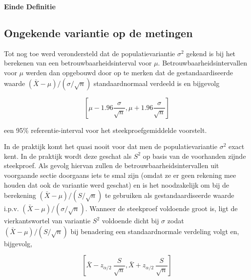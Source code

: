 \documentclass[
  12pt,dutch,coursenotes]{book}
\theoremstyle{definition}
\theoremstyle{definition}
\theoremstyle{definition}
\theoremstyle{remark}
\begin{document}
\textbf{Einde Definitie}

\hypertarget{sec:tBI}{%
\subsection{Ongekende variantie op de metingen}\label{sec:tBI}}

Tot nog toe werd verondersteld dat de populatievariantie \(\sigma^2\) gekend is bij het berekenen van een betrouwbaarheidsinterval voor \(\mu\).
Betrouwbaarheidsintervallen voor \(\mu\) werden dan opgebouwd door op te
merken dat de gestandaardiseerde waarde \((\bar{X} - \mu)/(\sigma/\sqrt{n})\)
standaardnormaal verdeeld is en bijgevolg

\begin{equation*}
\left[\mu - 1.96 \frac{\sigma}{\sqrt{n}},\mu + 1.96 \frac{\sigma}{\sqrt{n}}%
\right]
\end{equation*}

een 95\% referentie-interval voor het steekproefgemiddelde voorstelt.

In de praktijk komt het quasi nooit voor dat men de populatievariantie \(\sigma^2\) exact kent. In de praktijk wordt deze geschat als \(S^2\) op basis van de voorhanden zijnde steekproef. Als gevolg hiervan zullen de betrouwbaarheidsintervallen uit voorgaande sectie doorgaans iets te smal zijn (omdat ze er geen rekening mee houden dat ook de variantie werd geschat) en is het
noodzakelijk om bij de berekening \((\bar{X} - \mu)/(S/\sqrt{n})\) te
gebruiken als gestandaardiseerde waarde i.p.v. \((\bar{X} - \mu)/(\sigma/\sqrt{n})\). Wanneer de steekproef voldoende groot is, ligt de vierkantswortel van variantie \(S^2\) voldoende dicht bij \(\sigma\) zodat \({(\bar{X} - \mu)}/{(S/\sqrt{n}) }\) bij benadering een standaardnormale verdeling volgt en, bijgevolg,

\begin{equation*}
\left[\bar{X} - z_{\alpha/2} \ \frac{S}{\sqrt{n}} , \bar{X} + z_{\alpha/2} \
\frac{S}{\sqrt{n}}\right]
\end{equation*}
\end{document}
